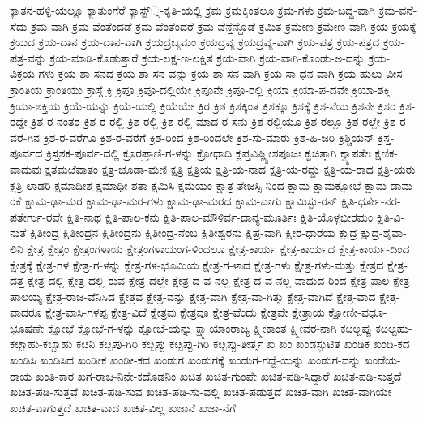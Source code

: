 ಕ್ಯಾತನ-ಹಳ್ಳಿ-ಯಲ್ಲೂ
ಕ್ಯಾತುಂಗೆರೆ
ಕ್ಯಾಸ್ಟ್್ಸ-ಕೃತಿ-ಯಲ್ಲಿ
ಕ್ರಮ
ಕ್ರಮಕ್ಕಿಂತಲೂ
ಕ್ರಮ-ಗಳು
ಕ್ರಮ-ಬದ್ಧ-ವಾಗಿ
ಕ್ರಮ-ವನೆ-ಸೆದು
ಕ್ರಮ-ವಾಗಿ
ಕ್ರಮ-ವೆಂತೆಂದಡೆ
ಕ್ರಮ-ವೆಂತೆಂದರೆ
ಕ್ರಮ-ವೆನ್ತೆನ್ದೊಡೆ
ಕ್ರಮಿತ
ಕ್ರಮೇಣ
ಕ್ರಮೇಣ-ವಾಗಿ
ಕ್ರಯ
ಕ್ರಯಕ್ಕೆ
ಕ್ರಯದ
ಕ್ರಯ-ದಾನ
ಕ್ರಯ-ದಾನ-ವಾಗಿ
ಕ್ರಯದ್ರಬ್ಯಮಂ
ಕ್ರಯದ್ರವ್ಯ
ಕ್ರಯದ್ರವ್ಯ-ವಾಗಿ
ಕ್ರಯ-ಪತ್ರ
ಕ್ರಯ-ಪತ್ರದ
ಕ್ರಯ-ಪತ್ರ-ವನ್ನು
ಕ್ರಯ-ಮಾಡಿ-ಕೊಡುತ್ತಾರೆ
ಕ್ರಯ-ಲಕ್ಷ-ಣ-ಲಕ್ಷಿತ
ಕ್ರಯ-ವಾಗಿ
ಕ್ರಯ-ವಾಗಿ-ಕೊಂಡು-ಅ-ದನ್ನು
ಕ್ರಯ-ವಿಕ್ರಯ-ಗಳು
ಕ್ರಯ-ಶಾ-ಸನದ
ಕ್ರಯ-ಶಾ-ಸನ-ವನ್ನು
ಕ್ರಯ-ಶಾ-ಸನ-ವಾಗಿ
ಕ್ರಯ-ಸಾ-ಧನ-ವಾಗಿ
ಕ್ರಯ-ಹುಲು-ವೀಸ
ಕ್ರಾಂತಿಯ
ಕ್ರಾಂತಿಯು
ಕ್ರಾಸ್ಗೆ
ಕ್ರಿ
ಕ್ರಿಪೂ
ಕ್ರಿಪೂ-ದಲ್ಲಿಯೇ
ಕ್ರಿಪೂನೇ
ಕ್ರಿಪೂ-ರಲ್ಲಿ
ಕ್ರಿಯಾ
ಕ್ರಿಯಾ-ಪ-ದವೇ
ಕ್ರಿಯಾ-ಶಕ್ತಿ
ಕ್ರಿಯಾ-ಶಕ್ತಿಯ
ಕ್ರಿಯೆ-ಯನ್ನು
ಕ್ರಿಯೆ-ಯಲ್ಲಿ
ಕ್ರಿಯೆಯೇ
ಕ್ರಿರ
ಕ್ರಿಶ
ಕ್ರಿಶಕ್ಕಿಂತ
ಕ್ರಿಶಕ್ಕೂ
ಕ್ರಿಶಕ್ಕೆ
ಕ್ರಿಶ-ನೆಯ
ಕ್ರಿಶನೇ
ಕ್ರಿಶರ
ಕ್ರಿಶ-ರದ್ದೇ
ಕ್ರಿಶ-ರ-ನಂತರ
ಕ್ರಿಶ-ರ-ರಲ್ಲಿ
ಕ್ರಿಶ-ರಲ್ಲಿ
ಕ್ರಿಶ-ರಲ್ಲಿ-ಮಾದ-ರ-ಸನು
ಕ್ರಿಶ-ರಲ್ಲಿಯೂ
ಕ್ರಿಶ-ರಲ್ಲೂ
ಕ್ರಿಶ-ರಲ್ಲೇ
ಕ್ರಿಶ-ರ-ವರೆ-ಗಿನ
ಕ್ರಿಶ-ರ-ವರೆಗೂ
ಕ್ರಿಶ-ರ-ವರೆಗೆ
ಕ್ರಿಶ-ರಿಂದ
ಕ್ರಿಶ-ರಿಂದಲೇ
ಕ್ರಿಶ-ಸು-ಮಾರು
ಕ್ರಿಶ-ಹಿ-ಜರಿ
ಕ್ರಿಶ್ಚಿಯನ್
ಕ್ರಿಸ್ತ-ಪೂರ್ವದ
ಕ್ರಿಸ್ತಶಕ-ಪೂರ್ವ-ದಲ್ಲಿ
ಕ್ರೂರಪ್ರಾಣಿ-ಗ-ಳನ್ನು
ಕ್ರೋಧಾದಿ
ಕ್ಲಪ್ತವಿಷ್ಣ್ವೀಶಪೂಜಃ
ಕ್ವಚಿತ್ತಾಗಿ
ಕ್ವ್ಮಾಪತೇಃ
ಕ್ಷಣಿಕ-ವಾದುವು
ಕ್ಷತಮಱೆವಾತಂ
ಕ್ಷತ್ರ-ಚೂಡಾ-ಮಣಿ
ಕ್ಷತ್ರಿ
ಕ್ಷತ್ರಿಯ
ಕ್ಷತ್ರಿ-ಯ-ನಾದ
ಕ್ಷತ್ರಿ-ಯ-ರದ್ದು
ಕ್ಷತ್ರಿ-ಯ-ರಾದ
ಕ್ಷತ್ರಿ-ಯರು
ಕ್ಷತ್ರಿ-ಲಾಡರಿ
ಕ್ಷಮಾಧೀಶ
ಕ್ಷಮಾಧೀ-ಶತಾ
ಕ್ಷಮಿಸಿ
ಕ್ಷಮೆಯಂ
ಕ್ಷಾತ್ರ-ತೇಜಸ್ಸಿ-ನಿಂದ
ಕ್ಷಾಮ
ಕ್ಷಾಮಕ್ಷೋಭೆ
ಕ್ಷಾಮ-ಡಾಮ-ರಕೆ
ಕ್ಷಾಮ-ಢಾ-ಮರ
ಕ್ಷಾಮ-ಢಾ-ಮರ-ಗಳು
ಕ್ಷಾಮ-ಢಾ-ಮರದ
ಕ್ಷಾಮ-ವಾಗು
ಕ್ಷಾಮಿಸ್ಫು-ರನ್
ಕ್ಷಿತಿ-ಧರ್ತೇ-ನರ-ಪತೇರ್ಗು-ರವೇ
ಕ್ಷಿತಿ-ನಾಥ
ಕ್ಷಿತಿ-ಪಾಲ-ಕನು
ಕ್ಷಿತಿ-ಪಾಲ-ಮೌಳಿರ್ವ-ದಾನ್ಯ-ಮೂರ್ತಿಃ
ಕ್ಷಿತಿ-ಯೊಳ್ಗಭೀರಮಂ
ಕ್ಷಿತಿ-ವಿ-ನುತೆ
ಕ್ಷಿತೀಂದ್ರ
ಕ್ಷಿತೀಂದ್ರನ
ಕ್ಷಿತೀಂದ್ರನು
ಕ್ಷಿತೀಂದ್ರ-ನೆಂಬ
ಕ್ಷಿತೀಶ್ವರನು
ಕ್ಷಿಪ್ರ-ವಾಗಿ
ಕ್ಷೀರ-ಧಾರೆಯ
ಕ್ಷುದ್ರ
ಕ್ಷುದ್ರ-ಶೈವಾ-ಲಿನಿ
ಕ್ಷೇತ್ರ
ಕ್ಷೇತ್ರಂ
ಕ್ಷೇತ್ರಂಗಳಾಯ
ಕ್ಷೇತ್ರಂಗಳಾಯಂಗ-ಳಿಂದಲೂ
ಕ್ಷೇತ್ರ-ಕಾರ್ಯ
ಕ್ಷೇತ್ರ-ಕಾರ್ಯದ
ಕ್ಷೇತ್ರ-ಕಾರ್ಯ-ದಿಂದ
ಕ್ಷೇತ್ರಕ್ಕೆ
ಕ್ಷೇತ್ರ-ಗಳ
ಕ್ಷೇತ್ರ-ಗ-ಳನ್ನು
ಕ್ಷೇತ್ರ-ಗಳ-ಭೂಮಿಯ
ಕ್ಷೇತ್ರ-ಗ-ಳಾದ
ಕ್ಷೇತ್ರ-ಗಳು
ಕ್ಷೇತ್ರ-ಗಳು-ಮತ್ತು
ಕ್ಷೇತ್ರದ
ಕ್ಷೇತ್ರ-ದತ್ತ
ಕ್ಷೇತ್ರ-ದಲ್ಲಿ
ಕ್ಷೇತ್ರ-ದಲ್ಲಿ-ರುವ
ಕ್ಷೇತ್ರ-ದಲ್ಲೇ
ಕ್ಷೇತ್ರ-ದ-ವ-ನಲ್ಲ
ಕ್ಷೇತ್ರ-ದ-ವ-ನಲ್ಲ-ವಾದುದ-ರಿಂದ
ಕ್ಷೇತ್ರ-ಪಾಲ
ಕ್ಷೇತ್ರ-ಪಾಲಯ್ಯ
ಕ್ಷೇತ್ರ-ರಾಜ-ವೆನಿಸಿದ
ಕ್ಷೇತ್ರವ
ಕ್ಷೇತ್ರ-ವನ್ನು
ಕ್ಷೇತ್ರ-ವಾಗಿ
ಕ್ಷೇತ್ರ-ವಾ-ಗಿತ್ತು
ಕ್ಷೇತ್ರ-ವಾಗಿದೆ
ಕ್ಷೇತ್ರ-ವಾದ
ಕ್ಷೇತ್ರ-ವಾದರೂ
ಕ್ಷೇತ್ರ-ವಾಸಿ-ಗಳಪ್ಪ
ಕ್ಷೇತ್ರ-ವಿದೆ
ಕ್ಷೇತ್ರವು
ಕ್ಷೇತ್ರವೂ
ಕ್ಷೇತ್ರ-ವೆಂದು
ಕ್ಷೇತ್ರವೇ
ಕ್ಷೇತ್ರಾಯ
ಕ್ಷೋಣೀ-ವಧೂ-ಭೂಷಣೇ
ಕ್ಷೋಭೆ
ಕ್ಷೋಭೆ-ಗ-ಳನ್ನು
ಕ್ಷೋಭೆ-ಯನ್ನು
ಕ್ಷ್ಮಾಯಾಂರಾಜ್ಯ
ಕ್ಷ್ಮೀಕಾಂತ
ಕ್ಷ್ಮೀವರ-ನಾಗಿ
ಕೞಅ್ಬಪ್ಪು
ಕೞಅ್ಬಹು-ಕೞ್ಬಾಹು-ಕಬ್ಬಾಹು
ಕೞನಿ
ಕೞ್ಬಪು-ಗಿರಿ
ಕೞ್ಬಪ್ಪು
ಕೞ್ಬಪ್ಪು-ಗಿರಿ
ಕೞ್ಬಪ್ಪು-ತೀರ್ತ್ತ
ಖ
ಖಂ
ಖಂಡಸ್ಫುಟಿತ
ಖಂಡಿಕ
ಖಂಡಿ-ಕದ
ಖಂಡಿಸಿ
ಖಂಡಿಸಿದ
ಖಂಡೀಕ
ಖಂಡೀ-ಕದ
ಖಂಡುಗ
ಖಂಡುಗಕ್ಕೆ
ಖಂಡುಗ-ಗದ್ದೆ-ಯನ್ನು
ಖಂಡುಗ-ವನ್ನು
ಖಂಡೆಯ-ರಾಯ
ಖಂತಿ-ಕಾರ
ಖಗ-ರಾಜ-ನಿನೇ-ಕದೊಡನಿಂ
ಖಚಿತ
ಖಚಿತ-ಗುಂಪೇ
ಖಚಿತ-ಪಡಿ-ಸಿದ್ದಾರೆ
ಖಚಿತ-ಪಡಿ-ಸುತ್ತದೆ
ಖಚಿತ-ಪಡಿ-ಸುತ್ತವೆ
ಖಚಿತ-ಪಡಿ-ಸುವ
ಖಚಿತ-ಪಡಿ-ಸು-ವಲ್ಲಿ
ಖಚಿತ-ಪಡುತ್ತದೆ
ಖಚಿತ-ವಾಗಿ
ಖಚಿತ-ವಾಗಿಯೇ
ಖಚಿತ-ವಾಗುತ್ತದೆ
ಖಚಿತ-ವಾದ
ಖಚಿತ-ವಿಲ್ಲ
ಖಜಾನೆ
ಖಜಾ-ನೆಗೆ
